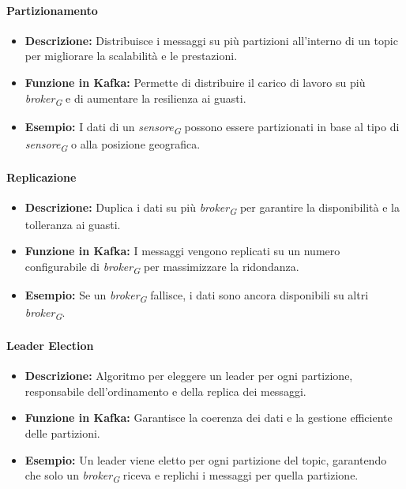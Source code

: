 \paragraph{Partizionamento}
\begin{itemize}
    \item \textbf{Descrizione:} Distribuisce i messaggi su più partizioni all'interno di un topic per migliorare la scalabilità e le prestazioni.
    \item \textbf{Funzione in Kafka:} Permette di distribuire il carico di lavoro su più \textit{broker}\textsubscript{\textit{G}} e di aumentare la resilienza ai guasti.
    \item \textbf{Esempio:} I dati di un \textit{sensore}\textsubscript{\textit{G}} possono essere partizionati in base al tipo di \textit{sensore}\textsubscript{\textit{G}} o alla posizione geografica.
\end{itemize}

\paragraph{Replicazione}
\begin{itemize}
    \item \textbf{Descrizione:} Duplica i dati su più \textit{broker}\textsubscript{\textit{G}} per garantire la disponibilità e la tolleranza ai guasti.
    \item \textbf{Funzione in Kafka:} I messaggi vengono replicati su un numero configurabile di \textit{broker}\textsubscript{\textit{G}} per massimizzare la ridondanza.
    \item \textbf{Esempio:} Se un \textit{broker}\textsubscript{\textit{G}} fallisce, i dati sono ancora disponibili su altri \textit{broker}\textsubscript{\textit{G}}.
\end{itemize}



\paragraph{Leader Election}
\begin{itemize}
    \item \textbf{Descrizione:} Algoritmo per eleggere un leader per ogni partizione, responsabile dell'ordinamento e della replica dei messaggi.
    \item \textbf{Funzione in Kafka:} Garantisce la coerenza dei dati e la gestione efficiente delle partizioni.
    \item \textbf{Esempio:} Un leader viene eletto per ogni partizione del topic, garantendo che solo un \textit{broker}\textsubscript{\textit{G}} riceva e replichi i messaggi per quella partizione.
\end{itemize}


